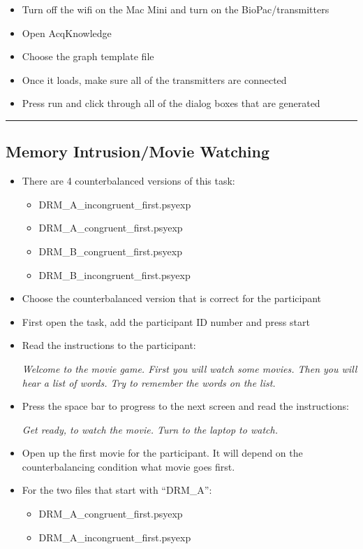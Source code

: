 \documentclass[]{book}
\providecommand{\tightlist}{%
  \setlength{\itemsep}{0pt}\setlength{\parskip}{0pt}}
\begin{document}
\begin{itemize}
\tightlist
\item
  Turn off the wifi on the Mac Mini and turn on the BioPac/transmitters
\item
  Open AcqKnowledge
\item
  Choose the graph template file
\item
  Once it loads, make sure all of the transmitters are connected
\item
  Press run and click through all of the dialog boxes that are generated
\end{itemize}

\begin{center}\rule{0.5\linewidth}{0.5pt}\end{center}

\hypertarget{memory-intrusionmovie-watching}{%
\subsection{Memory Intrusion/Movie Watching}\label{memory-intrusionmovie-watching}}

\begin{itemize}
\item
  There are 4 counterbalanced versions of this task:

  \begin{itemize}
  \tightlist
  \item
    DRM\_A\_incongruent\_first.psyexp
  \item
    DRM\_A\_congruent\_first.psyexp
  \item
    DRM\_B\_congruent\_first.psyexp
  \item
    DRM\_B\_incongruent\_first.psyexp
  \end{itemize}
\item
  Choose the counterbalanced version that is correct for the participant
\item
  First open the task, add the participant ID number and press start
\item
  Read the instructions to the participant:

  \emph{Welcome to the movie game. First you will watch some movies. Then you will hear a list of words. Try to remember the words on the list.}
\item
  Press the space bar to progress to the next screen and read the instructions:

  \emph{Get ready, to watch the movie. Turn to the laptop to watch.}
\item
  Open up the first movie for the participant. It will depend on the counterbalancing condition what movie goes first.
\item
  For the two files that start with ``DRM\_A'':

  \begin{itemize}
  \tightlist
  \item
    DRM\_A\_congruent\_first.psyexp
  \item
    DRM\_A\_incongruent\_first.psyexp
  \end{itemize}
\end{itemize}
\end{document}
